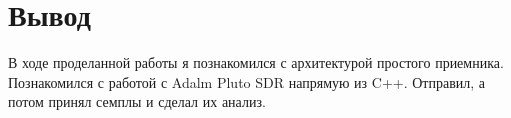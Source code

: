 \chapter{Вывод}
\label{ch:chap3}

В ходе проделанной работы я познакомился с архитектурой простого приемника. Познакомился с работой с Adalm Pluto SDR напрямую из 
C++. Отправил, а потом принял семплы и сделал их анализ.

\endinput